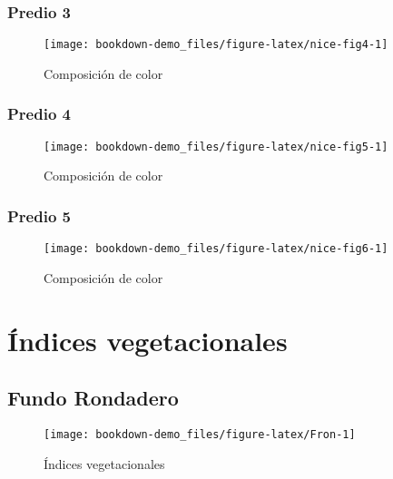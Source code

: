 \documentclass[]{report}
\begin{document}
\subsection{Predio 3}\label{predio-3}

\begin{figure}

{\centering \texttt{[image: bookdown-demo\_files/figure-latex/nice-fig4-1]} 

}

\caption[one plot]{Composición de color}\label{fig:nice-fig4}
\end{figure}

\subsection{Predio 4}\label{predio-4}

\begin{figure}

{\centering \texttt{[image: bookdown-demo\_files/figure-latex/nice-fig5-1]} 

}

\caption[one plot]{Composición de color}\label{fig:nice-fig5}
\end{figure}

\subsection{Predio 5}\label{predio-5}

\begin{figure}

{\centering \texttt{[image: bookdown-demo\_files/figure-latex/nice-fig6-1]} 

}

\caption[one plot]{Composición de color}\label{fig:nice-fig6}
\end{figure}

\hypertarget{indicesVeg}{\chapter{Índices
vegetacionales}\label{indicesVeg}}

\section{Fundo Rondadero}\label{fundo-rondadero-1}

\begin{figure}

{\centering \texttt{[image: bookdown-demo\_files/figure-latex/Fron-1]} 

}

\caption{Índices vegetacionales}\label{fig:Fron}
\end{figure}
\end{document}
